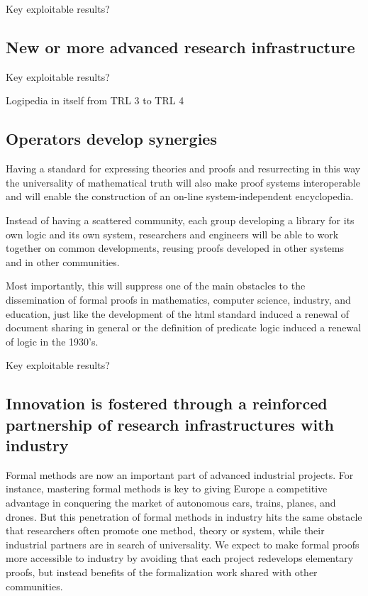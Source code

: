 {\color{red} Key exploitable results?}

\subsection{New or more advanced research infrastructure}

{\color{red} Key exploitable results?}

Logipedia in itself from TRL 3 to TRL 4


\subsection{Operators develop synergies}

Having a standard for expressing theories and proofs and resurrecting
in this way the universality of mathematical truth will also make proof
systems interoperable and will enable the construction of an on-line
system-independent encyclopedia.

Instead of having a scattered community, each group developing a
library for its own logic and its own system, researchers and
engineers will be able to work together on common developments,
reusing proofs developed in other systems and in other communities.

Most importantly, this will suppress one of the main obstacles to the
dissemination of formal proofs in mathematics, computer science, industry,
and education, just like the development of the html standard induced
a renewal of document sharing in general or the definition of
predicate logic induced a renewal of logic in the 1930's.


{\color{red} Key exploitable results?}


\subsection{Innovation is fostered through a reinforced partnership of research
infrastructures with industry}

Formal methods are now an important part of advanced
industrial projects. For instance, mastering formal methods is key to
giving Europe a competitive advantage in conquering the market of
autonomous cars, trains, planes, and drones. But this penetration of
formal methods in industry hits the same obstacle that researchers
often promote one method, theory or system, while their industrial
partners are in search of universality. We expect to make formal
proofs more accessible to industry by avoiding that each project
redevelops elementary proofs, but instead benefits of the formalization
work shared with other communities.

